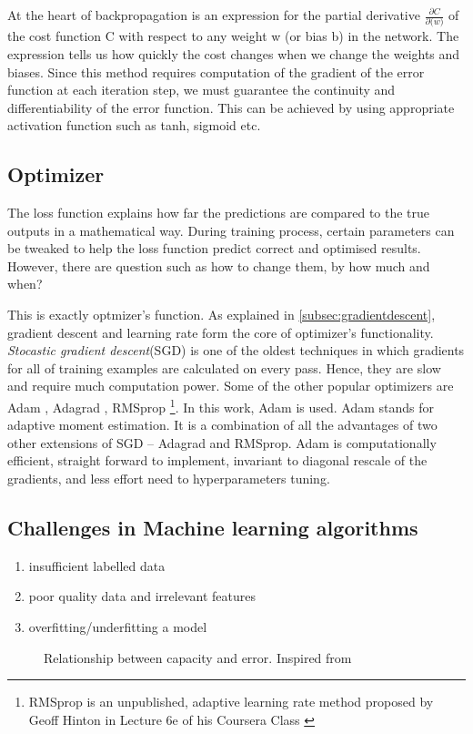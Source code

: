 At the heart of backpropagation is an expression for the partial derivative
$\frac{\partial C}{\partial \mathbf(w)}$ of the cost function C with respect to any weight w (or bias b) in the network. The expression tells us how quickly the cost changes when we change the weights and biases.
Since this method requires computation of the gradient of the error function at each
iteration step, we must guarantee the continuity and differentiability of the error
function. This can be achieved by using appropriate activation function such as tanh,
sigmoid etc.


\subsection{Optimizer}
\label{subsec:optimizer}
The loss function explains how far the predictions are compared to the true
outputs in a mathematical way. During training process, certain parameters can be tweaked
to help the loss function predict correct and optimised results. However, there are
question such as how to change them, by how much and when?

This is exactly optmizer's function. As explained in \ref{subsec:gradientdescent}, gradient
descent and learning rate form the core of optimizer's functionality. \textit{Stocastic
gradient descent}(SGD) is one of the oldest techniques in which gradients for all of
training examples are calculated on every pass. Hence, they are slow
and require much computation power. Some of the other popular optimizers are Adam
\cite{kingma2014adam}, Adagrad \cite{adagradpaper}, RMSprop \footnote{RMSprop is an unpublished, adaptive learning rate
method proposed by Geoff Hinton in Lecture 6e of his Coursera Class \cite{RMSProp}}. In this work, Adam is used. Adam stands for adaptive moment estimation.
It is a combination of all the advantages of two other extensions of SGD -- Adagrad and
RMSprop. Adam is computationally efficient, straight forward to implement, invariant to
diagonal rescale of the gradients, and less effort need to hyperparameters tuning.

\subsection{Challenges in Machine learning algorithms}
\begin{enumerate}
    \item insufficient labelled data
    \item poor quality data and irrelevant features
    \item overfitting/underfitting a model
\end{enumerate}
\begin{figure}[h]
	\centering
    \def\svgwidth{0.7\textwidth}
    \caption{Relationship between capacity and error. Inspired from
    \cite{Goodfellow-et-al-2016}}
    \label{fig:overfittingunderfitting}
\end{figure}

